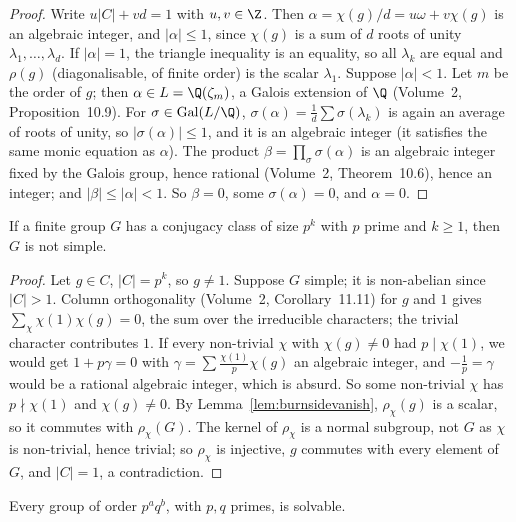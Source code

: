 \begin{proof}
Write $u|C|+vd=1$ with $u,v\in\Z$. Then $\alpha=\chi(g)/d=u\omega+v\chi(g)$ is an algebraic integer, and $|\alpha|\le1$, since $\chi(g)$ is a sum of $d$ roots of unity $\lambda_1,\dots,\lambda_d$. If $|\alpha|=1$, the triangle inequality
is an equality, so all $\lambda_k$ are equal and $\rho(g)$ (diagonalisable, of finite order) is the scalar $\lambda_1$. Suppose $|\alpha|<1$. Let $m$ be the order of $g$; then $\alpha\in L=\Q(\zeta_m)$, a Galois extension of $\Q$
(Volume~2, Proposition~10.9). For $\sigma\in\operatorname{Gal}(L/\Q)$, $\sigma(\alpha)=\frac1d\sum\sigma(\lambda_k)$ is again an average of roots of unity, so $|\sigma(\alpha)|\le1$, and it is an algebraic integer (it satisfies the same monic
equation as $\alpha$). The product $\beta=\prod_\sigma\sigma(\alpha)$ is an algebraic integer fixed by the Galois group, hence rational (Volume~2, Theorem~10.6), hence an integer; and $|\beta|\le|\alpha|<1$. So $\beta=0$, some
$\sigma(\alpha)=0$, and $\alpha=0$.
\end{proof}

\begin{proposition}\label{prop:primepowerclass}
If a finite group $G$ has a conjugacy class of size $p^k$ with $p$ prime and $k\ge1$, then $G$ is not simple.
\end{proposition}

\begin{proof}
Let $g\in C$, $|C|=p^k$, so $g\ne1$. Suppose $G$ simple; it is non-abelian since $|C|>1$. Column orthogonality (Volume~2, Corollary~11.11) for $g$ and $1$ gives $\sum_\chi\chi(1)\chi(g)=0$, the sum over the irreducible
characters; the trivial character contributes $1$. If every non-trivial $\chi$ with $\chi(g)\ne0$ had $p\mid\chi(1)$, we would get $1+p\gamma=0$ with $\gamma=\sum\frac{\chi(1)}p\chi(g)$ an algebraic integer, and $-\frac1p=\gamma$
would be a rational algebraic integer, which is absurd. So some non-trivial $\chi$ has $p\nmid\chi(1)$ and $\chi(g)\ne0$. By Lemma~\ref{lem:burnsidevanish}, $\rho_\chi(g)$ is a scalar, so it commutes with $\rho_\chi(G)$. The kernel of $\rho_\chi$ is
a normal subgroup, not $G$ as $\chi$ is non-trivial, hence trivial; so $\rho_\chi$ is injective, $g$ commutes with every element of $G$, and $|C|=1$, a contradiction.
\end{proof}

\begin{theorem}[Burnside, 1904]\label{thm:burnsidepq}
Every group of order $p^aq^b$, with $p,q$ primes, is solvable.
\end{theorem}

